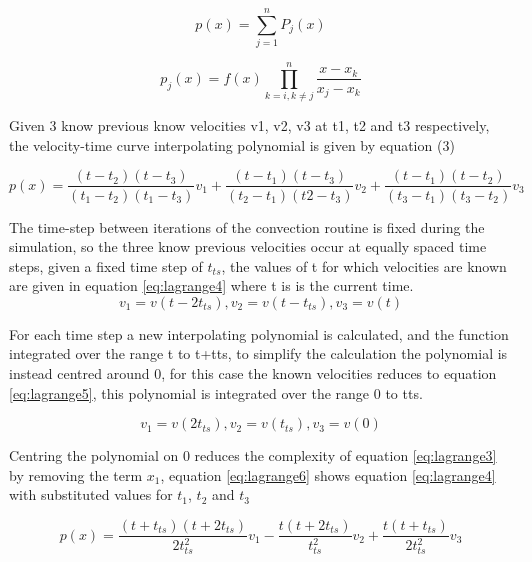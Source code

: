 \begin{equation}
\label{eq:lagrange1}
p(x)=\sum_{j=1}^{n} P_j(x)
\end{equation}

\begin{equation}
\label{eq:lagrange2}
p_j(x)=f(x)\prod_{k=i, k\neq j}^{n} \frac{x-x_k}{x_j-x_k}
\end{equation}

Given 3 know previous know velocities v1, v2, v3 at t1, t2 and t3 respectively, the velocity-time curve interpolating polynomial is given by equation (3)

\begin{equation}
\label{eq:lagrange3}
p(x)=\frac{(t-t_2)(t-t_3)}{(t_1-t_2)(t_1-t_3)}v_1+\frac{(t-t_1)(t-t_3)}{(t_2-t_1)(t2-t_3)}v_2+\frac{(t-t_1)(t-t_2)}{(t_3-t_1)(t_3-t_2)}v_3
\end{equation}

The time-step between iterations of the convection routine is fixed during the simulation, so the three know previous velocities occur at equally spaced time steps, given a fixed time step of $t_{ts}$, the values of t for which velocities are known are given in equation \ref{eq:lagrange4} where t is is the current time.
\begin{equation}
\label{eq:lagrange4}
v_1=v(t-2t_{ts}), v_2=v(t-t_{ts}), v_3=v(t)
\end{equation}

For each time step a new interpolating polynomial is calculated, and the function integrated over the range t to t+tts, to simplify the calculation the polynomial is instead centred around 0, for this case the known velocities reduces to equation \ref{eq:lagrange5}, this polynomial is integrated over the range 0 to tts.

\begin{equation}
\label{eq:lagrange5}
v_1=v(2t_{ts}), v_2=v(t_{ts}), v_3=v(0)
\end{equation}

Centring the polynomial on 0 reduces the complexity of equation \ref{eq:lagrange3} by removing the term $x_1$, equation \ref{eq:lagrange6} shows equation \ref{eq:lagrange4} with substituted values for $t_1$, $t_2$ and $t_3$

\begin{equation}
\label{eq:lagrange6}
p(x)=\frac{(t+t_{ts})(t+2t_{ts})}{2t_{ts}^2}v_1-\frac{t(t+2t_{ts})}{t_{ts}^2}v_2+\frac{t(t+t_{ts})}{2t_{ts}^2}v_3
\end{equation}


